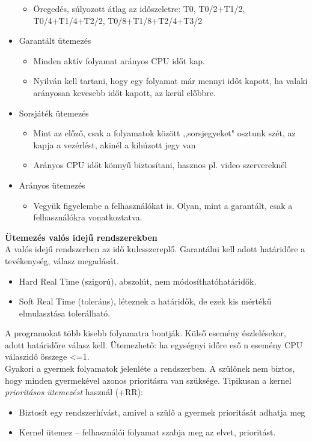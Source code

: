 \documentclass[margin=0px]{article}
\begin{document}
\begin{itemize}
\begin{itemize}
			\item Öregedés, súlyozott átlag az időszeletre: T0, T0/2+T1/2, T0/4+T1/4+T2/2, T0/8+T1/8+T2/4+T3/2
		\end{itemize}
		\item Garantált ütemezés
		\begin{itemize}
			\item Minden aktív folyamat arányos CPU időt kap.
			\item Nyilván kell tartani, hogy egy folyamat már mennyi időt kapott, ha valaki arányosan kevesebb időt kapott, az kerül előbbre.
		\end{itemize}
		\item Sorsjáték ütemezés
		\begin{itemize}
			\item Mint az előző, csak a folyamatok között ,,sorsjegyeket" osztunk szét, az kapja a vezérlést, akinél a kihúzott jegy van
			\item Arányos CPU időt könnyű biztosítani, hasznos pl. video szervereknél
		\end{itemize}
		\item Arányos ütemezés
		\begin{itemize}
			\item Vegyük figyelembe a felhasználókat is. Olyan, mint a garantált, csak a felhasználókra vonatkoztatva.
		\end{itemize}
	\end{itemize}
	\textbf{Ütemezés valós idejű rendszerekben} \\
	A valós idejű rendszerben az idő kulcsszereplő. Garantálni kell adott határidőre a tevékenység, válasz megadását.
	\begin{itemize}
		\item Hard Real Time (szigorú), abszolút, nem módosíthatóhatáridők.
		\item Soft Real Time (toleráns), léteznek a határidők, de ezek kis mértékű elmulasztása tolerálható.
	\end{itemize} 
	A programokat több kisebb folyamatra bontják. Külső esemény észlelésekor, adott határidőre válasz
	kell. Ütemezhető: ha egységnyi időre eső n esemény CPU válaszidő összege <=1. \\
	Gyakori a gyermek folyamatok jelenléte a rendszerben. A szülőnek nem biztos, hogy minden
	gyermekével azonos prioritásra van szüksége. Tipikusan a kernel \textit{prioritásos ütemezést}
	használ (+RR):
	\begin{itemize}
		\item Biztosít egy rendszerhívást, amivel a szülő a gyermek prioritását adhatja meg
		\item Kernel ütemez -- felhasználói folyamat szabja meg az elvet, prioritást. 
	\end{itemize}
	
\end{document}
